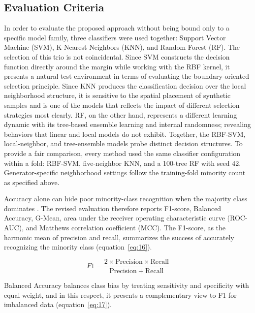 \documentclass[pdflatex]{sn-jnl}
\begin{document}
\endgroup
\clearpage

\subsection{Evaluation Criteria}

In order to evaluate the proposed approach without being bound only to a specific model family, three classifiers were used together: Support Vector Machine (SVM), K-Nearest Neighbors (KNN), and Random Forest (RF). The selection of this trio is not coincidental. Since SVM constructs the decision function directly around the margin while working with the RBF kernel, it presents a natural test environment in terms of evaluating the boundary-oriented selection principle. Since KNN produces the classification decision over the local neighborhood structure, it is sensitive to the spatial placement of synthetic samples and is one of the models that reflects the impact of different selection strategies most clearly. RF, on the other hand, represents a different learning dynamic with its tree-based ensemble learning and internal randomness; revealing behaviors that linear and local models do not exhibit. Together, the RBF-SVM, local-neighbor, and tree-ensemble models probe distinct decision structures. To provide a fair comparison, every method used the same classifier configuration within a fold: RBF-SVM, five-neighbor KNN, and a 100-tree RF with seed 42. Generator-specific neighborhood settings follow the training-fold minority count as specified above.

Accuracy alone can hide poor minority-class recognition when the majority class dominates \cite{ref46}. The revised evaluation therefore reports F1-score, Balanced Accuracy, G-Mean, area under the receiver operating characteristic curve (ROC-AUC), and Matthews correlation coefficient (MCC). The F1-score, as the harmonic mean of precision and recall, summarizes the success of accurately recognizing the minority class (equation~\eqref{eq:16}).

\begin{equation}\label{eq:16}
F1 = \frac{2\times\mathrm{Precision}\times\mathrm{Recall}}{\mathrm{Precision}+\mathrm{Recall}}
\end{equation}

Balanced Accuracy balances class bias by treating sensitivity and specificity with equal weight, and in this respect, it presents a complementary view to F1 for imbalanced data (equation~\eqref{eq:17}).
\end{document}
